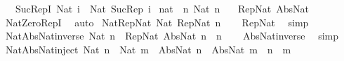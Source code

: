 \begin{isabellebody}
\ \ {\isacharbar}{\kern0pt}\ Suc{\isacharunderscore}{\kern0pt}RepI{\isacharcolon}{\kern0pt}\ {\isachardoublequoteopen}Nat\ i\ {\isasymLongrightarrow}\ Nat\ {\isacharparenleft}{\kern0pt}Suc{\isacharunderscore}{\kern0pt}Rep\ i{\isacharparenright}{\kern0pt}{\isachardoublequoteclose}\isanewline
\isanewline
{}\isamarkupfalse%
\ nat\ {\isacharequal}{\kern0pt}\ {\isachardoublequoteopen}{\isacharbraceleft}{\kern0pt}n{\isachardot}{\kern0pt}\ Nat\ n{\isacharbraceright}{\kern0pt}{\isachardoublequoteclose}\isanewline
\ \ \ Rep{\isacharunderscore}{\kern0pt}Nat\ Abs{\isacharunderscore}{\kern0pt}Nat\isanewline
%
\isadelimproof
\ \ %
\endisadelimproof
%
\isatagproof
{}\isamarkupfalse%
\ Nat{\isachardot}{\kern0pt}Zero{\isacharunderscore}{\kern0pt}RepI\ \isamarkupfalse%
\ auto%
\endisatagproof
{\isafoldproof}%
%
\isadelimproof
\isanewline
%
\endisadelimproof
\isanewline
{}\isamarkupfalse%
\ Nat{\isacharunderscore}{\kern0pt}Rep{\isacharunderscore}{\kern0pt}Nat{\isacharcolon}{\kern0pt}\ {\isachardoublequoteopen}Nat\ {\isacharparenleft}{\kern0pt}Rep{\isacharunderscore}{\kern0pt}Nat\ n{\isacharparenright}{\kern0pt}{\isachardoublequoteclose}\isanewline
%
\isadelimproof
\ \ %
\endisadelimproof
%
\isatagproof
{}\isamarkupfalse%
\ Rep{\isacharunderscore}{\kern0pt}Nat\ \isamarkupfalse%
\ simp%
\endisatagproof
{\isafoldproof}%
%
\isadelimproof
\isanewline
%
\endisadelimproof
\isanewline
{}\isamarkupfalse%
\ Nat{\isacharunderscore}{\kern0pt}Abs{\isacharunderscore}{\kern0pt}Nat{\isacharunderscore}{\kern0pt}inverse{\isacharcolon}{\kern0pt}\ {\isachardoublequoteopen}Nat\ n\ {\isasymLongrightarrow}\ Rep{\isacharunderscore}{\kern0pt}Nat\ {\isacharparenleft}{\kern0pt}Abs{\isacharunderscore}{\kern0pt}Nat\ n{\isacharparenright}{\kern0pt}\ {\isacharequal}{\kern0pt}\ n{\isachardoublequoteclose}\isanewline
%
\isadelimproof
\ \ %
\endisadelimproof
%
\isatagproof
{}\isamarkupfalse%
\ Abs{\isacharunderscore}{\kern0pt}Nat{\isacharunderscore}{\kern0pt}inverse\ \isamarkupfalse%
\ simp%
\endisatagproof
{\isafoldproof}%
%
\isadelimproof
\isanewline
%
\endisadelimproof
\isanewline
{}\isamarkupfalse%
\ Nat{\isacharunderscore}{\kern0pt}Abs{\isacharunderscore}{\kern0pt}Nat{\isacharunderscore}{\kern0pt}inject{\isacharcolon}{\kern0pt}\ {\isachardoublequoteopen}Nat\ n\ {\isasymLongrightarrow}\ Nat\ m\ {\isasymLongrightarrow}\ Abs{\isacharunderscore}{\kern0pt}Nat\ n\ {\isacharequal}{\kern0pt}\ Abs{\isacharunderscore}{\kern0pt}Nat\ m\ {\isasymlongleftrightarrow}\ n\ {\isacharequal}{\kern0pt}\ m{\isachardoublequoteclose}\isanewline

\end{isabellebody}
